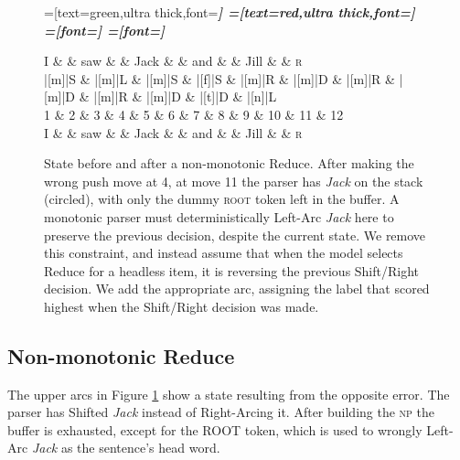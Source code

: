 \documentclass[11pt,letterpaper]{article}
\begin{document}
\begin{figure}
    \centering
    \begin{dependency}[theme=simple]
    =[text=green,ultra thick,font=\bfseries\itshape]
    =[text=red,ultra thick,font=\bfseries\itshape]
    =[font=\bfseries\itshape]
    =[font=\itshape]
    \begin{deptext}[column sep=.075cm, row sep=.1ex]
        I \&           \& saw \&          \& Jack       \& \& and     \&           \& Jill \&   \& \textsc{r} \\
       |[m]|S \& |[m]|L \& |[m]|S   \& |[f]|S \& |[m]|R \& |[m]|D \& |[m]|R \& |[m]|D \& |[m]|R \& |[m]|D \& |[t]|D \& |[n]|L \\
            1 \&     2       \& 3  \&   4      \& 5          \& 6 \& 7     \& 8 \& 9 \& 10 \& 11 \& 12 \\
            I \&           \& saw \&          \& Jack       \& \& and     \&           \& Jill \& \& \textsc{r} \\
\end{deptext}
    
    
\end{dependency}
\caption{
State before and after a non-monotonic Reduce.
After making the wrong push move at 4, at move 11
the parser has \emph{Jack} on the stack (circled), with only the dummy \textsc{root}
token left in the buffer. A monotonic parser must deterministically Left-Arc
\emph{Jack} here to preserve the previous decision, despite the current state.
We remove this constraint, and instead assume that when the model selects Reduce
for a headless item, it is reversing the previous Shift/Right decision. We add
the appropriate arc, assigning the label that scored highest when the Shift/Right
decision was made.
\label{fig:adduce}}
\end{figure}


\subsection{Non-monotonic Reduce}

The upper arcs in Figure \ref{fig:adduce} show a state resulting from the opposite error.
The parser has Shifted \emph{Jack} instead of Right-Arcing it. After
building the \textsc{np} the buffer is exhausted, except for the ROOT token,
which is used to wrongly Left-Arc \emph{Jack} as the sentence's head word.
\end{document}
